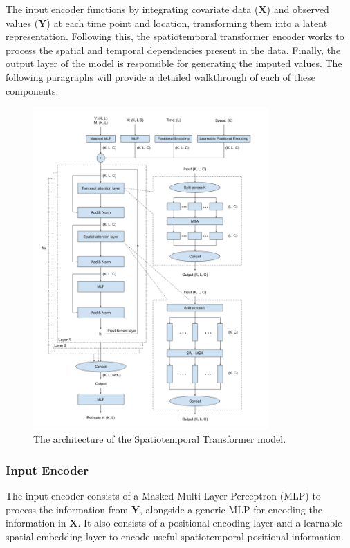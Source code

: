 \documentclass[11pt]{article}
\begin{document}
The input encoder functions by integrating covariate data ($\boldsymbol{X}$) and observed values ($\boldsymbol{Y}$) at each time point and location, transforming them into a latent representation. Following this, the spatiotemporal transformer encoder works to process the spatial and temporal dependencies present in the data. Finally, the output layer of the model is responsible for generating the imputed values. The following paragraphs will provide a detailed walkthrough of each of these components.



\begin{figure}
\centering
\includegraphics[width=0.8\textwidth]{figure/st_transformer.png}
\caption{The architecture of the Spatiotemporal Transformer model.}
\label{fig: st_transformer}
\end{figure}




\subsubsection*{Input Encoder} 
The input encoder consists of a Masked Multi-Layer Perceptron (MLP) to process the information from $\boldsymbol{Y}$, alongside a generic MLP for encoding the information in $\boldsymbol{X}$. It also consists of a positional encoding layer and a learnable spatial embedding layer to encode useful spatiotemporal positional information.
\end{document}
